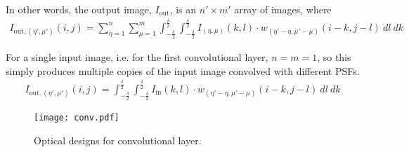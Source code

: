 \documentclass{article}
\begin{document}
In other words, the output image, $I_\text{out}$, is an $n' \times m'$ array of images, where
\begin{align}
I_{\text{out}, (\eta',\mu')} (i,j)= \sum^n_{\eta = 1} \sum^m_{\mu = 1} \int_{-\frac{\delta}{2}}^{\frac{\delta}{2}}  \int_{-\frac{\delta}{2}}^{\frac{\delta}{2}} I_{(\eta,\mu)}(k, l) \cdot w_{(\eta' - \eta, \mu' - \mu)}(i-k, j-l) \ dl \ dk
\end{align} 

For a single input image, i.e. for the first convolutional layer, $n = m = 1$, so this simply produces multiple copies of the input image convolved with different PSFs.
\begin{align}
I_{\text{out}, (\eta',\mu')} (i,j)= \int_{-\frac{\delta}{2}}^{\frac{\delta}{2}}  \int_{-\frac{\delta}{2}}^{\frac{\delta}{2}} I_\text{in}(k, l) \cdot w_{(\eta' - \eta, \mu' - \mu)}(i-k, j-l) \ dl \ dk
\end{align} 

\begin{figure}[h]
  \begin{center}
  \texttt{[image: conv.pdf]}
  \end{center}
  \caption{Optical designs for convolutional layer.}
  \label{conv}
\end{figure}


\end{document}
